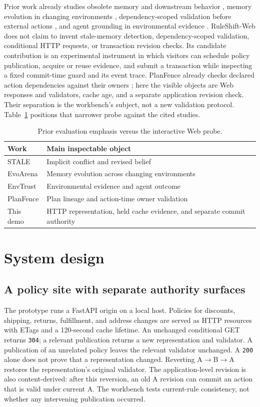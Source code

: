 \documentclass[sigconf,screen,review]{acmart}
\begin{document}
Prior work already studies obsolete memory and downstream behavior
\cite{stale}, memory evolution in changing environments \cite{evoarena},
dependency-scoped validation before external actions \cite{planfence},
and agent grounding in environmental evidence \cite{envtrust}.
RuleShift-Web does not claim to invent stale-memory detection,
dependency-scoped validation, conditional HTTP requests, or transaction
revision checks. Its candidate contribution is an experimental instrument in
which visitors can schedule policy publication, acquire or reuse evidence,
and submit a transaction while inspecting a fixed commit-time guard and its
event trace. PlanFence already checks declared action dependencies against their
owners \cite{planfence}; here the visible objects are Web responses and validators, cache age,
and a separate application revision check. Their separation is the
workbench's subject, not a new validation protocol. Table~\ref{tab:prior}
positions that narrower probe against the cited studies.

\begin{table}[t]
\caption{Prior evaluation emphasis versus the interactive Web probe.}
\label{tab:prior}
\small
\begin{tabular}{lp{}}
\toprule
Work & Main inspectable object \\
\midrule
STALE \cite{stale} & Implicit conflict and revised belief \\
EvoArena \cite{evoarena} & Memory evolution across changing environments \\
EnvTrust \cite{envtrust} & Environmental evidence and agent outcome \\
PlanFence \cite{planfence} & Plan lineage and action-time owner validation \\
This demo & HTTP representation, held cache evidence, and separate commit authority \\
\bottomrule
\end{tabular}
\end{table}

\section{System design}
\subsection{A policy site with separate authority surfaces}
The prototype runs a FastAPI origin on a local host. Policies for discounts,
shipping, returns, fulfillment, and address changes are served as HTTP
resources with ETags and a 120-second cache lifetime. An unchanged conditional GET
returns \texttt{304}; a relevant publication returns a new representation and
validator. A publication of an unrelated policy leaves the relevant validator
unchanged. A \texttt{200} alone does not prove that a representation changed.
Reverting A$\rightarrow$B$\rightarrow$A restores the representation's
original validator.
The application-level revision is also content-derived: after this reversion,
an old A revision can commit an action that is valid under current A. The
workbench tests current-rule consistency, not whether any intervening
publication occurred.
\end{document}
